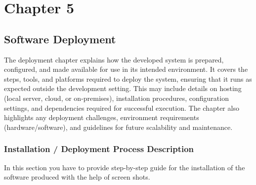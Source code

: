 


\setcounter{chapter}{5}
\setcounter{figure}{0}
\setcounter{table}{0}
\chapter*{Chapter 5}
\section{Software Deployment}

The deployment chapter explains how the developed system is prepared, configured, and made available for use in its intended environment. It covers the steps, tools, and platforms required to deploy the system, ensuring that it runs as expected outside the development setting. This may include details on hosting (local server, cloud, or on-premises), installation procedures, configuration settings, and dependencies required for successful execution. The chapter also highlights any deployment challenges, environment requirements (hardware/software), and guidelines for future scalability and maintenance.

\subsection{Installation / Deployment Process Description}

In this section you have to provide step-by-step guide for the installation of the software produced with the help of screen shots. 

\setcounter{chapter}{5}           
